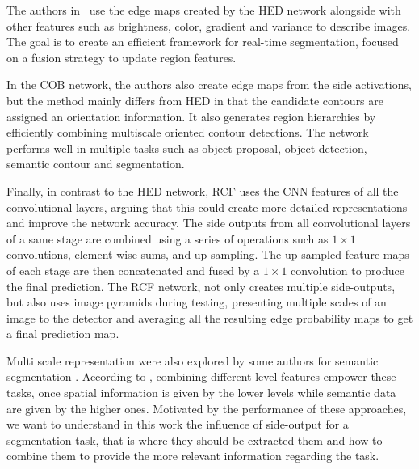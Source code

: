 The authors in~\cite{cheng2016} use the edge maps created by the HED network alongside with other features such as brightness, color, gradient and variance to describe images. The goal is to create an efficient framework for real-time segmentation, focused on a fusion strategy to update region features.


In the COB network, the authors also create edge maps from the side activations, but the method mainly differs from HED in that the candidate contours are assigned an orientation information. It also generates region hierarchies by efficiently combining multiscale oriented contour detections. The network performs well in multiple tasks such as object proposal, object detection, semantic contour and segmentation.


Finally, in contrast to the HED network, RCF uses the CNN features of all the convolutional layers, arguing that this could create more detailed representations and improve the network accuracy. The side outputs from all convolutional layers of a same stage are combined using a series of operations such as $1\times1$ convolutions, element-wise sums, and up-sampling. The up-sampled feature maps of each stage are then concatenated and fused by a $1\times1$ convolution to produce the final prediction. The RCF network, not only creates multiple side-outputs, but also uses image pyramids during testing, presenting multiple scales of an image to the detector and averaging all the resulting edge probability maps to get a final prediction map. 

Multi scale representation were also explored by some authors for semantic segmentation \cite{Long2015, Yang2018, Oeljeklaus2018, Alvarez2012, Oliveira2016}. According to \cite{Yang2018}, combining different level features empower these tasks, once spatial information is given by the lower levels while semantic data are given by the higher ones. Motivated by the performance of these approaches, we want to understand in this work the influence of side-output for a segmentation task, that is where they should be extracted them and how to combine them to provide the more relevant information regarding the task.

